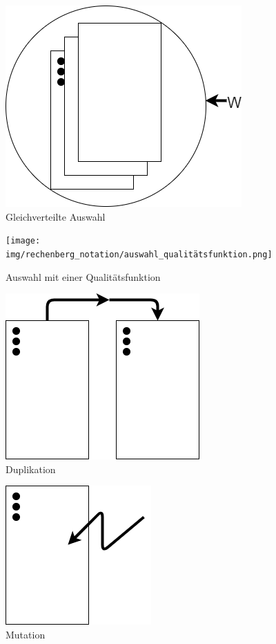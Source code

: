\begin{figure}[!htb]
	\centering
	\includegraphics[scale=0.5]{img/rechenberg_notation/auswahl_gleichverteilt.png}
	\caption{Gleichverteilte Auswahl}
\label{fig:auswahl_gleichverteilt}
\end{figure}
\begin{figure}[!htb]
	\centering
	\texttt{[image: img/rechenberg\_notation/auswahl\_qualitätsfunktion.png]}
	\caption{Auswahl mit einer Qualitätsfunktion}
\label{fig:auswahl_qualitätsfunktion}
\end{figure}
\begin{figure}[!htb]
	\centering
	\includegraphics[scale=0.5]{img/rechenberg_notation/duplikation.png}
	\caption{Duplikation}
\label{fig:duplikation}
\end{figure}
\begin{figure}[!htb]
	\centering
	\includegraphics[scale=0.5]{img/rechenberg_notation/mutation.png}
	\caption{Mutation}
\label{fig:mutation}
\end{figure}
